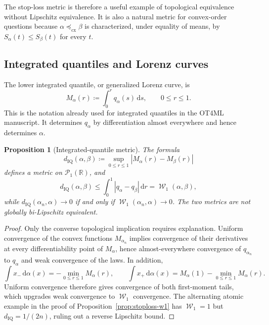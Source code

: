 \documentclass[11pt]{article}
\newtheorem{proposition}[theorem]{Proposition}
\newcommand{\RR}{\mathbb R}
\newcommand{\Pp}{\mathcal P}
\renewcommand{\d}{\,\mathrm d}
\newcommand{\al}{\alpha}
\newcommand{\be}{\beta}
\DeclareMathOperator{\Wass}{\mathcal W}
\newcommand{\eqdef}{\coloneqq}
\begin{document}
The stop-loss metric is therefore a useful example of topological equivalence
without Lipschitz equivalence.  It is also a natural metric for convex-order
questions because $\al\preceq_{\mathrm{cx}}\be$ is characterized, under
equality of means, by $S_\al(t)\leq S_\be(t)$ for every $t$.

\subsection{Integrated quantiles and Lorenz curves}

The lower integrated quantile, or generalized Lorenz curve, is
\begin{equation}\label{eq:integrated-quantile}
 M_\al(r)\eqdef\int_0^r q_\al(s)\d s,
 \qquad 0\leq r\leq1.
\end{equation}
This is the notation already used for integrated quantiles in the OT4ML
manuscript.  It determines $q_\al$ by differentiation almost everywhere and
hence determines $\al$.

\begin{proposition}[Integrated-quantile metric]
\label{prop:integrated-quantile-metric}
The formula
\begin{equation}\label{eq:integrated-quantile-metric}
 d_{\mathrm{IQ}}(\al,\be)
 \eqdef\sup_{0\leq r\leq1}|M_\al(r)-M_\be(r)|
\end{equation}
defines a metric on $\Pp_1(\RR)$, and
\begin{equation}\label{eq:integrated-quantile-w1}
 d_{\mathrm{IQ}}(\al,\be)
 \leq\int_0^1|q_\al-q_\be|\d r
 =\Wass_1(\al,\be),
\end{equation}
while $d_{\mathrm{IQ}}(\al_n,\al)\to0$ if and only if
$\Wass_1(\al_n,\al)\to0$.  The two metrics are not globally bi-Lipschitz
equivalent.
\end{proposition}

\begin{proof}
Only the converse topological implication requires explanation.  Uniform
convergence of the convex functions $M_{\al_n}$ implies convergence of their
derivatives at every differentiability point of $M_\al$, hence almost-everywhere
convergence of $q_{\al_n}$ to $q_\al$ and weak convergence of the laws.  In
addition,
\begin{equation*}
 \int x_-\d\al(x)=-\min_{0\leq r\leq1}M_\al(r),
 \qquad
 \int x_+\d\al(x)=M_\al(1)-\min_{0\leq r\leq1}M_\al(r).
\end{equation*}
Uniform convergence therefore gives convergence of both first-moment tails,
which upgrades weak convergence to $\Wass_1$ convergence.  The alternating
atomic example in the proof of Proposition~\ref{prop:stoploss-w1} has
$\Wass_1=1$ but $d_{\mathrm{IQ}}=1/(2n)$, ruling out a reverse Lipschitz bound.
\end{proof}
\end{document}
